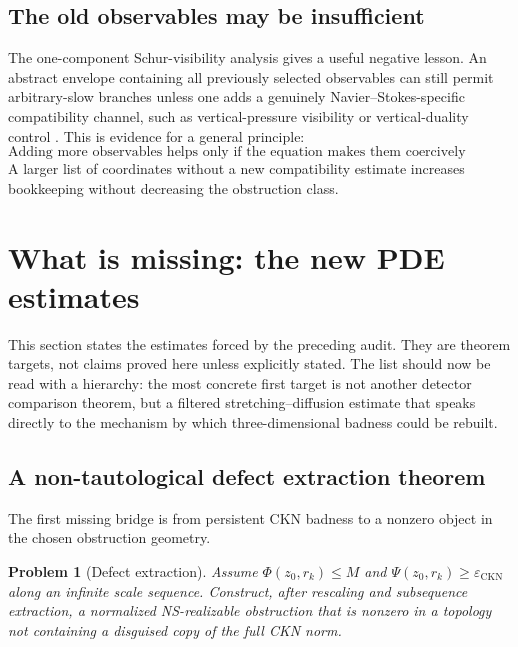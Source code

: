 \documentclass[11pt]{article}
\numberwithin{equation}{section}
\newtheorem{problem}[theorem]{Problem}
\theoremstyle{remark}
\newcommand{\eps}{\varepsilon}
\newcommand{\CKN}{\mathrm{CKN}}
\begin{document}
\subsection{The old observables may be insufficient}

The one-component Schur-visibility analysis gives a useful negative lesson. An abstract envelope containing all previously selected observables can still permit arbitrary-slow branches unless one adds a genuinely Navier--Stokes-specific compatibility channel, such as vertical-pressure visibility or vertical-duality control \cite{YuSchur2026}. This is evidence for a general principle:
\begin{equation}\label{eq:observable-principle}
\boxed{
\text{Adding more observables helps only if the equation makes them coercively compatible.}
}
\end{equation}
A larger list of coordinates without a new compatibility estimate increases bookkeeping without decreasing the obstruction class.

\section{What is missing: the new PDE estimates}\label{sec:new-estimates}

This section states the estimates forced by the preceding audit. They are theorem targets, not claims proved here unless explicitly stated. The list should now be read with a hierarchy: the most concrete first target is not another detector comparison theorem, but a filtered stretching--diffusion estimate that speaks directly to the mechanism by which three-dimensional badness could be rebuilt.

\subsection{A non-tautological defect extraction theorem}

The first missing bridge is from persistent CKN badness to a nonzero object in the chosen obstruction geometry.

\begin{problem}[Defect extraction]\label{prob:defect-extraction}
Assume $\Phi(z_0,r_k)\le M$ and $\Psi(z_0,r_k)\ge\eps_{\CKN}$ along an infinite scale sequence. Construct, after rescaling and subsequence extraction, a normalized NS-realizable obstruction that is nonzero in a topology not containing a disguised copy of the full CKN norm.
\end{problem}
\end{document}
